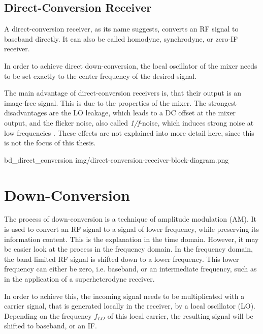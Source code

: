 \subsection{Direct-Conversion Receiver}

A direct-conversion receiver, as its name suggests, converts an RF signal to baseband directly.
It can also be called homodyne, synchrodyne, or zero-IF receiver.

In order to achieve direct down-conversion, the local oscillator of the mixer needs to be set exactly to the center frequency of the desired signal.

The main advantage of direct-conversion receivers is, that their output is an image-free signal.
This is due to the properties of the mixer.
The strongest disadvantages are the LO leakage, which leads to a DC offset at the mixer output, and the flicker noise, also called \textit{1/f}-noise, which induces strong noise at low frequencies \cite{PassosFábio2020AHSo}.
These effects are not explained into more detail here, since this is not the focus of this thesis.

 {bd_direct_conversion} {img/direct-conversion-receiver-block-diagram.png}


\section{Down-Conversion}

The process of down-conversion is a technique of amplitude modulation (AM).
It is used to convert an RF signal to a signal of lower frequency, while preserving its information content.
This is the explanation in the time domain.
However, it may be easier look at the process in the frequency domain.
In the frequency domain, the band-limited RF signal is shifted down to a lower frequency.
This lower frequency can either be zero, i.e. baseband, or an intermediate frequency, such as in the application of a superheterodyne receiver.

In order to achieve this, the incoming signal needs to be multiplicated with a carrier signal, that is generated locally in the receiver, by a local oscillator (LO).
Depending on the frequency $f_{LO}$ of this local carrier, the resulting signal will be shifted to baseband, or an IF.

